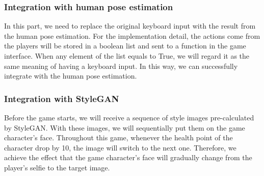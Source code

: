 \subsubsection{Integration with human pose estimation}

In this part, we need to replace the original keyboard input with the result from the human pose estimation. For the implementation detail, the actions come from the players will be stored in a boolean list and sent to a function in the game interface. When any element of the list equals to True, we will regard it as the same meaning of having a keyboard input. In this way, we can successfully integrate with the human pose estimation.

\subsubsection{Integration with StyleGAN}
Before the game starts, we will receive a sequence of style images pre-calculated by StyleGAN. With these images, we will sequentially put them on the game character's face. Throughout this game, whenever the health point of the character drop by 10, the image will switch to the next one. Therefore, we achieve the effect that the game character's face will gradually change from the player's selfie to the target image.